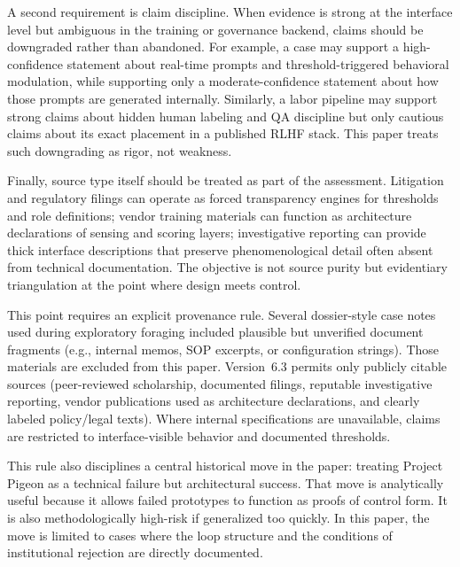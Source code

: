 \documentclass[runningheads]{llncs}
\begin{document}
A second requirement is claim discipline. When evidence is strong at the interface level but ambiguous in the training or governance backend, claims should be downgraded rather than abandoned. For example, a case may support a high-confidence statement about real-time prompts and threshold-triggered behavioral modulation, while supporting only a moderate-confidence statement about how those prompts are generated internally. Similarly, a labor pipeline may support strong claims about hidden human labeling and QA discipline but only cautious claims about its exact placement in a published RLHF stack. This paper treats such downgrading as rigor, not weakness.

Finally, source type itself should be treated as part of the assessment. Litigation and regulatory filings can operate as forced transparency engines for thresholds and role definitions; vendor training materials can function as architecture declarations of sensing and scoring layers; investigative reporting can provide thick interface descriptions that preserve phenomenological detail often absent from technical documentation. The objective is not source purity but evidentiary triangulation at the point where design meets control.

This point requires an explicit provenance rule. Several dossier-style case notes used during exploratory foraging included plausible but unverified document fragments (e.g., internal memos, SOP excerpts, or configuration strings). Those materials are excluded from this paper. Version~6.3 permits only publicly citable sources (peer-reviewed scholarship, documented filings, reputable investigative reporting, vendor publications used as architecture declarations, and clearly labeled policy/legal texts). Where internal specifications are unavailable, claims are restricted to interface-visible behavior and documented thresholds.

This rule also disciplines a central historical move in the paper: treating Project Pigeon as a technical failure but architectural success. That move is analytically useful because it allows failed prototypes to function as proofs of control form. It is also methodologically high-risk if generalized too quickly. In this paper, the move is limited to cases where the loop structure and the conditions of institutional rejection are directly documented.
\end{document}
